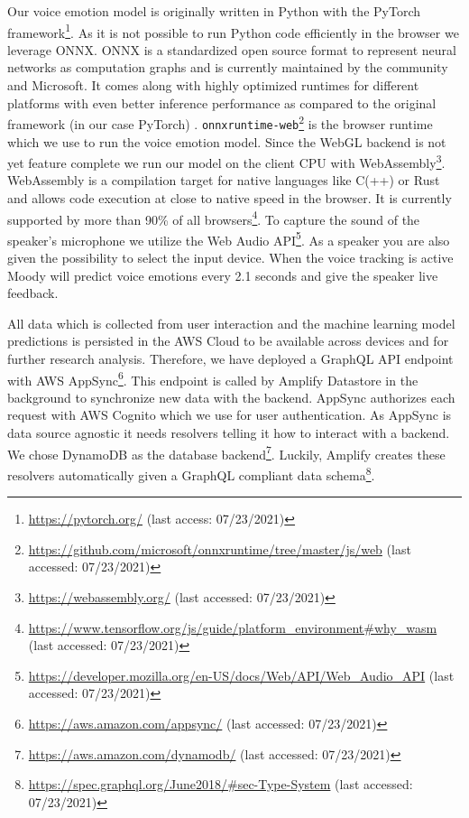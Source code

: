 Our voice emotion model is originally written in Python with the PyTorch framework\footnote{\url{https://pytorch.org/} (last access: 07/23/2021)}. As it is not possible to run Python code efficiently in the browser we leverage ONNX. ONNX is a standardized open source format to represent neural networks as computation graphs and is currently maintained by the community and Microsoft. It comes along with highly optimized runtimes for different platforms with even better inference performance as compared to the original framework (in our case PyTorch) \cite{onnx_runtime_developers_onnx_2021}. \texttt{onnxruntime-web}\footnote{\url{https://github.com/microsoft/onnxruntime/tree/master/js/web} (last accessed: 07/23/2021)} is the browser runtime which we use to run the voice emotion model. Since the WebGL backend is not yet feature complete we run our model on the client CPU with WebAssembly\footnote{\url{https://webassembly.org/} (last accessed: 07/23/2021)}. WebAssembly is a compilation target for native languages like C(++) or Rust and allows code execution at close to native speed in the browser. It is currently supported by more than 90\% of all browsers\footnote{\url{https://www.tensorflow.org/js/guide/platform_environment#why_wasm} (last accessed: 07/23/2021)}. To capture the sound of the speaker’s microphone we utilize the Web Audio API\footnote{\url{https://developer.mozilla.org/en-US/docs/Web/API/Web_Audio_API} (last accessed: 07/23/2021)}. As a speaker you are also given the possibility to select the input device. When the voice tracking is active Moody will predict voice emotions every 2.1 seconds and give the speaker live feedback.

All data which is collected from user interaction and the machine learning model predictions is persisted in the AWS Cloud to be available across devices and for further research analysis. Therefore, we have deployed a GraphQL API endpoint with AWS AppSync\footnote{\url{https://aws.amazon.com/appsync/} (last accessed: 07/23/2021)}. This endpoint is called by Amplify Datastore in the background to synchronize new data with the backend. AppSync authorizes each request with AWS Cognito which we use for user authentication. As AppSync is data source agnostic it needs resolvers telling it how to interact with a backend. We chose DynamoDB as the database backend\footnote{\url{https://aws.amazon.com/dynamodb/} (last accessed: 07/23/2021)}. Luckily, Amplify creates these resolvers automatically given a GraphQL compliant data schema\footnote{\url{https://spec.graphql.org/June2018/#sec-Type-System} (last accessed: 07/23/2021)}.

